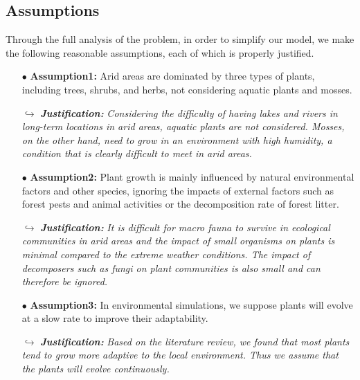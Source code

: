 \documentclass[12pt]{article}  %
\begin{document}
\subsection{Assumptions}
\vspace{-0.3cm}

Through the full analysis of the problem, in order to simplify our model, we make the following reasonable assumptions, each of which is properly justified.

\begin{itemize}
\vspace{-0.2cm}
\item[$\bullet$] \textbf{Assumption1:} Arid areas are dominated by three types of plants, including trees, shrubs, and herbs, not considering aquatic plants and mosses.
\vspace{-0.2cm}
\item[$\hookrightarrow $]\textit{\textbf{Justification:}} \textit{Considering the difficulty of having lakes and rivers in long-term locations in arid areas, aquatic plants are not considered. Mosses, on the other hand, need to grow in an environment with high humidity, a condition that is clearly difficult to meet in arid areas.}
\vspace{-0.2cm}
\item[$\bullet$] \textbf{Assumption2:} Plant growth is mainly influenced by natural environmental factors and other species, ignoring the impacts of external factors such as forest pests and animal activities or the decomposition rate of forest litter.
\vspace{-0.2cm}
\item[$\hookrightarrow $]\textit{\textbf{Justification:}} \textit{It is difficult for macro fauna to survive in ecological communities in arid areas and the impact of small organisms on plants is minimal compared to the extreme weather conditions. The impact of decomposers such as fungi on plant communities is also small and can therefore be ignored.}
\vspace{-0.2cm}
\item[$\bullet$] \textbf{Assumption3:} In environmental simulations, we suppose plants will evolve at a slow rate to improve their adaptability.
\vspace{-0.2cm}
\item[$\hookrightarrow $]\textit{\textbf{Justification:}} \textit{Based on the literature review, we found that most plants tend to grow more adaptive to the local environment. Thus we assume that the plants will evolve continuously.}

\end{itemize}
\end{document}
